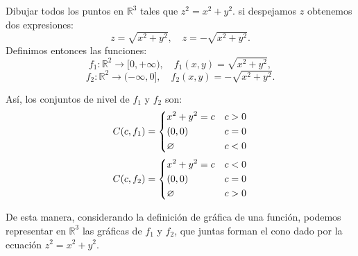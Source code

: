     
    \begin{obs} Dibujar todos los puntos en $\mathbb{R}^{3}$ tales que \( z^2 = x^2 + y^2 \).  si despejamos \( z \) obtenemos dos expresiones:
        \[
        z = \sqrt{x^2 + y^2} ,
        \quad
        z = -\sqrt{x^2 + y^2}.
        \]
        Definimos entonces las funciones:
        \[
        f_1 : \mathbb{R}^2 \to [0,+\infty), \quad f_1(x,y) = \sqrt{x^2 + y^2},
        \]
        \[
        f_2 : \mathbb{R}^2 \to (-\infty,0], \quad f_2(x,y) = -\sqrt{x^2 + y^2}.
        \]
        
        Así, los conjuntos de nivel de \( f_1 \) y \( f_2 \) son:
        \[
        C(c,f_1)=
        \begin{dcases}
        x^2+y^2=c  &  c>0 \\
        (0,0)  & c=0\\
        \varnothing  & c<0\\
        \end{dcases}
        \]
        \[
        C(c,f_2)=
        \begin{dcases}
        x^2+y^2=c  &  c<0 \\
        (0,0)  & c=0\\
        \varnothing  & c>0\\
        \end{dcases}
        \]

        De esta manera, considerando la definición de gráfica de una función, podemos representar en \(\mathbb{R}^3\) las gráficas de \( f_1 \) y \( f_2 \), que juntas forman el cono dado por la ecuación \( z^2 = x^2 + y^2 \).
        
        \begin{center}
\end{center}
\end{obs}

